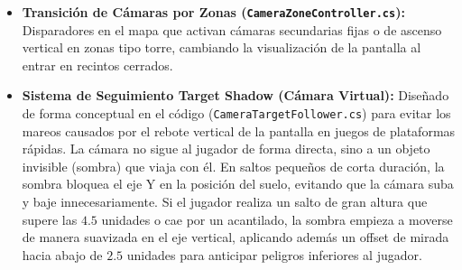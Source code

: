 \begin{itemize}
    \item \textbf{Transición de Cámaras por Zonas (\texttt{CameraZoneController.cs}):} Disparadores en el mapa que activan cámaras secundarias fijas o de ascenso vertical en zonas tipo torre, cambiando la visualización de la pantalla al entrar en recintos cerrados.
    \item \textbf{Sistema de Seguimiento Target Shadow (Cámara Virtual):} Diseñado de forma conceptual en el código (\texttt{CameraTargetFollower.cs}) para evitar los mareos causados por el rebote vertical de la pantalla en juegos de plataformas rápidas. La cámara no sigue al jugador de forma directa, sino a un objeto invisible (sombra) que viaja con él. En saltos pequeños de corta duración, la sombra bloquea el eje Y en la posición del suelo, evitando que la cámara suba y baje innecesariamente. Si el jugador realiza un salto de gran altura que supere las $4.5$ unidades o cae por un acantilado, la sombra empieza a moverse de manera suavizada en el eje vertical, aplicando además un offset de mirada hacia abajo de $2.5$ unidades para anticipar peligros inferiores al jugador.
\end{itemize}